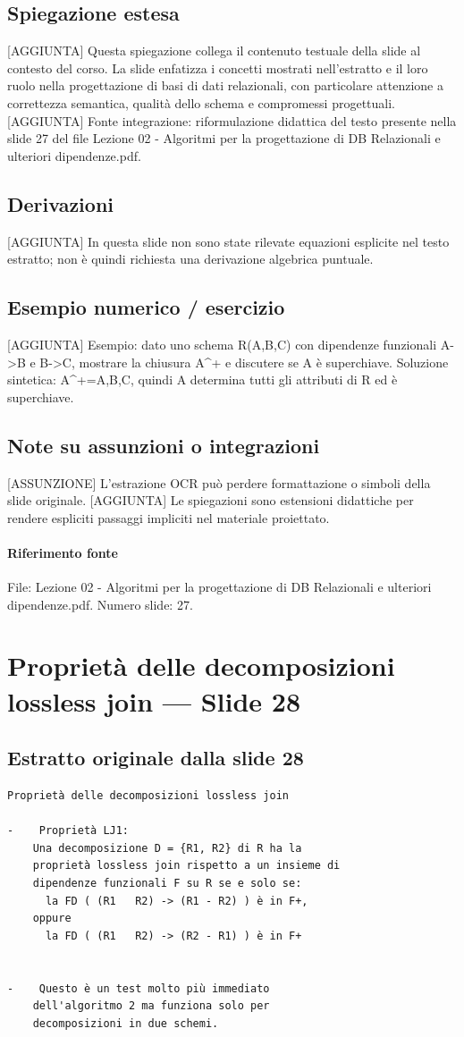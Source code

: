 \documentclass[11pt]{article}
\begin{document}
\subsection*{Spiegazione estesa}
[AGGIUNTA] Questa spiegazione collega il contenuto testuale della slide al contesto del corso. La slide enfatizza i concetti mostrati nell'estratto e il loro ruolo nella progettazione di basi di dati relazionali, con particolare attenzione a correttezza semantica, qualità dello schema e compromessi progettuali.
[AGGIUNTA] Fonte integrazione: riformulazione didattica del testo presente nella slide 27 del file Lezione 02 - Algoritmi per la progettazione di DB Relazionali e ulteriori dipendenze.pdf.
\subsection*{Derivazioni}
[AGGIUNTA] In questa slide non sono state rilevate equazioni esplicite nel testo estratto; non è quindi richiesta una derivazione algebrica puntuale.
\subsection*{Esempio numerico / esercizio}
[AGGIUNTA] Esempio: dato uno schema R(A,B,C) con dipendenze funzionali A->B e B->C, mostrare la chiusura A^+ e discutere se A è superchiave. Soluzione sintetica: A^+={A,B,C}, quindi A determina tutti gli attributi di R ed è superchiave.
\subsection*{Note su assunzioni o integrazioni}
[ASSUNZIONE] L'estrazione OCR può perdere formattazione o simboli della slide originale.
[AGGIUNTA] Le spiegazioni sono estensioni didattiche per rendere espliciti passaggi impliciti nel materiale proiettato.
\paragraph{Riferimento fonte} File: Lezione 02 - Algoritmi per la progettazione di DB Relazionali e ulteriori dipendenze.pdf. Numero slide: 27.
\section{Proprietà delle decomposizioni lossless join --- Slide 28}
\subsection*{Estratto originale dalla slide 28}
\begin{lstlisting}
Proprietà delle decomposizioni lossless join

-    Proprietà LJ1:
    Una decomposizione D = {R1, R2} di R ha la
    proprietà lossless join rispetto a un insieme di
    dipendenze funzionali F su R se e solo se:
      la FD ( (R1   R2) -> (R1 - R2) ) è in F+,
    oppure
      la FD ( (R1   R2) -> (R2 - R1) ) è in F+


-    Questo è un test molto più immediato
    dell'algoritmo 2 ma funziona solo per
    decomposizioni in due schemi.
\end{lstlisting}
\end{document}
